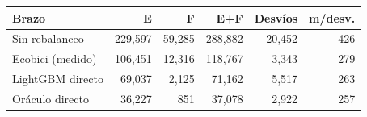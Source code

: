 \begin{tabular}{@{}lrrrrr@{}}
\toprule
Brazo & E & F & E+F & Desvíos & m/desv. \\
\midrule
Sin rebalanceo & 229,597 & 59,285 & 288,882 & 20,452 & 426 \\
Ecobici (medido) & 106,451 & 12,316 & 118,767 & 3,343 & 279 \\
LightGBM directo & 69,037 & 2,125 & 71,162 & 5,517 & 263 \\
Oráculo directo & 36,227 & 851 & 37,078 & 2,922 & 257 \\
\bottomrule
\end{tabular}

